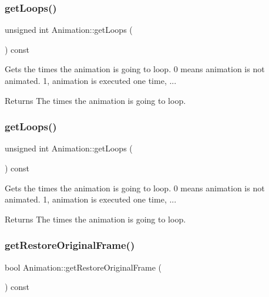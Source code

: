 \subsubsection{\texorpdfstring{get\+Loops()}{getLoops()}\hspace{0.1cm}{\footnotesize\ttfamily [1/2]}}
{\footnotesize\ttfamily unsigned int Animation\+::get\+Loops (\begin{DoxyParamCaption}{ }\end{DoxyParamCaption}) const\hspace{0.3cm}{\ttfamily [inline]}}

Gets the times the animation is going to loop. 0 means animation is not animated. 1, animation is executed one time, ...

\begin{DoxyReturn}{Returns}
The times the animation is going to loop. 
\end{DoxyReturn}
\mbox{\label{classAnimation_a8d7832e8872f8c7ae4c6c63181506da3}} 
\subsubsection{\texorpdfstring{get\+Loops()}{getLoops()}\hspace{0.1cm}{\footnotesize\ttfamily [2/2]}}
{\footnotesize\ttfamily unsigned int Animation\+::get\+Loops (\begin{DoxyParamCaption}{ }\end{DoxyParamCaption}) const\hspace{0.3cm}{\ttfamily [inline]}}

Gets the times the animation is going to loop. 0 means animation is not animated. 1, animation is executed one time, ...

\begin{DoxyReturn}{Returns}
The times the animation is going to loop. 
\end{DoxyReturn}
\mbox{\label{classAnimation_ac64dc1dd9ea5a78368906544d3404718}} 
\subsubsection{\texorpdfstring{get\+Restore\+Original\+Frame()}{getRestoreOriginalFrame()}\hspace{0.1cm}{\footnotesize\ttfamily [1/2]}}
{\footnotesize\ttfamily bool Animation\+::get\+Restore\+Original\+Frame (\begin{DoxyParamCaption}{ }\end{DoxyParamCaption}) const\hspace{0.3cm}{\ttfamily [inline]}}

